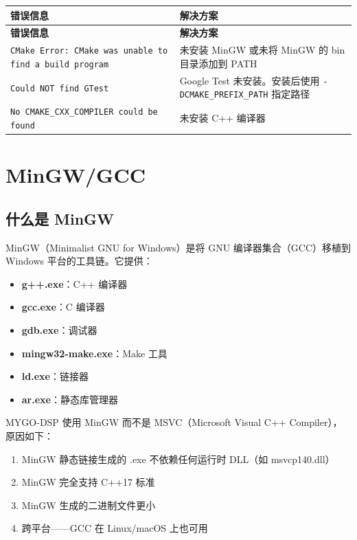 ﻿\documentclass[12pt,a4paper,oneside]{ctexbook}
\begin{document}
\begin{longtable}{p{4cm}p{9cm}}
    \toprule
    \textbf{错误信息} & \textbf{解决方案} \\
    \midrule
    \endfirsthead
    \toprule
    \textbf{错误信息} & \textbf{解决方案} \\
    \midrule
    \endhead
    \bottomrule
    \endfoot
    \texttt{CMake Error: CMake was unable to find a build program} & 未安装 MinGW 或未将 MinGW 的 bin 目录添加到 PATH \\
    \texttt{Could NOT find GTest} & Google Test 未安装。安装后使用 \texttt{-DCMAKE\_PREFIX\_PATH} 指定路径 \\
    \texttt{No CMAKE\_CXX\_COMPILER could be found} & 未安装 C++ 编译器 \\
    \bottomrule
\end{longtable}

\section{MinGW/GCC}

\subsection{什么是 MinGW}

MinGW（Minimalist GNU for Windows）是将 GNU 编译器集合（GCC）移植到 Windows 平台的工具链。它提供：

\begin{itemize}
    \item \textbf{g++.exe}：C++ 编译器
    \item \textbf{gcc.exe}：C 编译器
    \item \textbf{gdb.exe}：调试器
    \item \textbf{mingw32-make.exe}：Make 工具
    \item \textbf{ld.exe}：链接器
    \item \textbf{ar.exe}：静态库管理器
\end{itemize}

MYGO-DSP 使用 MinGW 而不是 MSVC（Microsoft Visual C++ Compiler），原因如下：
\begin{enumerate}
    \item MinGW 静态链接生成的 .exe 不依赖任何运行时 DLL（如 msvcp140.dll）
    \item MinGW 完全支持 C++17 标准
    \item MinGW 生成的二进制文件更小
    \item 跨平台——GCC 在 Linux/macOS 上也可用
\end{enumerate}
\end{document}
